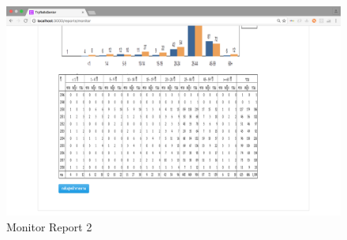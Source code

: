             \FloatBarrier
                \begin{figure}[h!]
                    \centering
                        \includegraphics[width=12cm]{images/chapter-01/mockup_rails/report2.png}
                    	\caption{Monitor Report 2}
                    	\label{report2}
                \end{figure}
            \FloatBarrier

